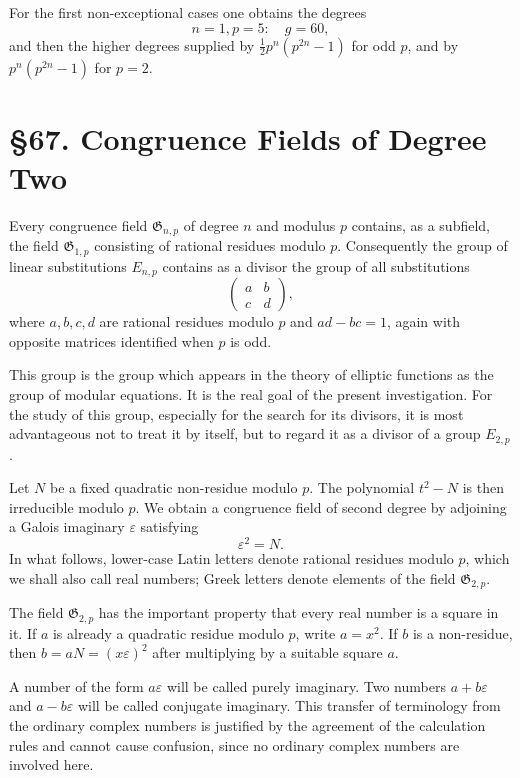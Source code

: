 \documentclass[11pt,a4paper]{book}
\newcommand{\webersection}[2]{\clearpage\section*{\S #1. #2}}
\begin{document}
For the first non-exceptional cases one obtains the degrees
\[
 n=1,p=5: \quad g=60,
\]
and then the higher degrees supplied by \(\frac12p^n(p^{2n}-1)\) for odd \(p\), and by \(p^n(p^{2n}-1)\) for \(p=2\).

\webersection{67}{Congruence Fields of Degree Two}

Every congruence field \(\mathfrak G_{n,p}\) of degree \(n\) and modulus \(p\) contains, as a subfield, the field \(\mathfrak G_{1,p}\) consisting of rational residues modulo \(p\).  Consequently the group of linear substitutions \(E_{n,p}\) contains as a divisor the group of all substitutions
\begin{equation}\label{eq:67-1}
 \begin{pmatrix}a&b\\c&d\end{pmatrix},
\end{equation}
where \(a,b,c,d\) are rational residues modulo \(p\) and \(ad-bc=1\), again with opposite matrices identified when \(p\) is odd.

This group is the group which appears in the theory of elliptic functions as the group of modular equations.  It is the real goal of the present investigation.  For the study of this group, especially for the search for its divisors, it is most advantageous not to treat it by itself, but to regard it as a divisor of a group \(E_{2,p}\).

Let \(N\) be a fixed quadratic non-residue modulo \(p\).  The polynomial \(t^2-N\) is then irreducible modulo \(p\).  We obtain a congruence field of second degree by adjoining a Galois imaginary \(\varepsilon\) satisfying
\begin{equation}\label{eq:67-2}
 \varepsilon^2=N.
\end{equation}
In what follows, lower-case Latin letters denote rational residues modulo \(p\), which we shall also call real numbers; Greek letters denote elements of the field \(\mathfrak G_{2,p}\).

The field \(\mathfrak G_{2,p}\) has the important property that every real number is a square in it.  If \(a\) is already a quadratic residue modulo \(p\), write \(a=x^2\).  If \(b\) is a non-residue, then \(b=aN=(x\varepsilon)^2\) after multiplying by a suitable square \(a\).

A number of the form \(a\varepsilon\) will be called purely imaginary.  Two numbers \(a+b\varepsilon\) and \(a-b\varepsilon\) will be called conjugate imaginary.  This transfer of terminology from the ordinary complex numbers is justified by the agreement of the calculation rules and cannot cause confusion, since no ordinary complex numbers are involved here.
\end{document}
